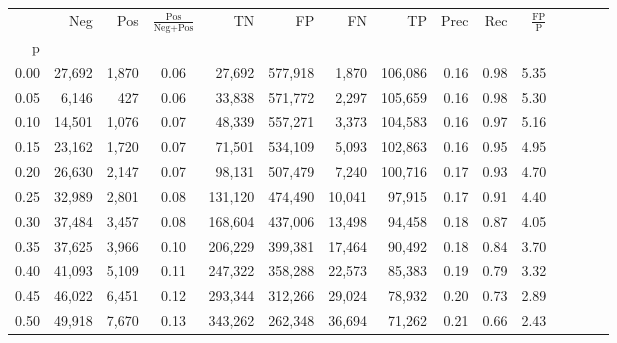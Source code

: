 \begin{tabular}{rrrcrrrrrrrrrrr}
\toprule
{} &     Neg &    Pos & $\frac{\text{Pos}}{\text{Neg}+\text{Pos}}$ &       TN &       FP &       FN &       TP &  Prec &   Rec & $\frac{\text{FP}}{\text{P}}$ \\
p    &         &        &                                            &          &          &          &          &       &       &                              \\
\midrule
0.00 &  27,692 &  1,870 &                                       0.06 &   27,692 &  577,918 &    1,870 &  106,086 &  0.16 &  0.98 &                         5.35 \\
0.05 &   6,146 &    427 &                                       0.06 &   33,838 &  571,772 &    2,297 &  105,659 &  0.16 &  0.98 &                         5.30 \\
0.10 &  14,501 &  1,076 &                                       0.07 &   48,339 &  557,271 &    3,373 &  104,583 &  0.16 &  0.97 &                         5.16 \\
0.15 &  23,162 &  1,720 &                                       0.07 &   71,501 &  534,109 &    5,093 &  102,863 &  0.16 &  0.95 &                         4.95 \\
0.20 &  26,630 &  2,147 &                                       0.07 &   98,131 &  507,479 &    7,240 &  100,716 &  0.17 &  0.93 &                         4.70 \\
0.25 &  32,989 &  2,801 &                                       0.08 &  131,120 &  474,490 &   10,041 &   97,915 &  0.17 &  0.91 &                         4.40 \\
0.30 &  37,484 &  3,457 &                                       0.08 &  168,604 &  437,006 &   13,498 &   94,458 &  0.18 &  0.87 &                         4.05 \\
0.35 &  37,625 &  3,966 &                                       0.10 &  206,229 &  399,381 &   17,464 &   90,492 &  0.18 &  0.84 &                         3.70 \\
0.40 &  41,093 &  5,109 &                                       0.11 &  247,322 &  358,288 &   22,573 &   85,383 &  0.19 &  0.79 &                         3.32 \\
0.45 &  46,022 &  6,451 &                                       0.12 &  293,344 &  312,266 &   29,024 &   78,932 &  0.20 &  0.73 &                         2.89 \\
0.50 &  49,918 &  7,670 &                                       0.13 &  343,262 &  262,348 &   36,694 &   71,262 &  0.21 &  0.66 &                         2.43 \\

\end{tabular}
